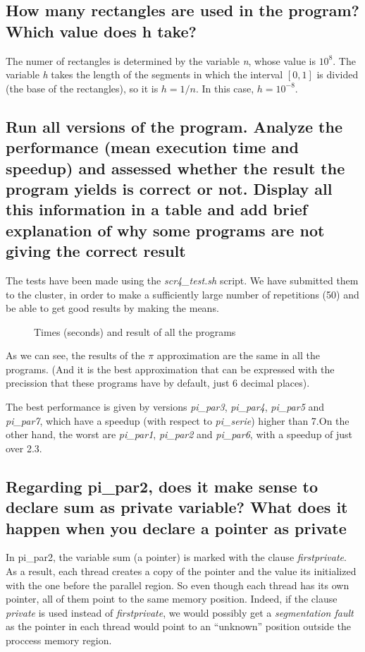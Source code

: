 \documentclass{article}
\newcommand{\question}[1]{\subsection{#1}}
\begin{document}
\question{How many rectangles are used in the program? Which value does h take?}

The numer of rectangles is determined by the variable \emph{n}, whose value is ${10^8}$. The variable \emph{h} takes the length of the segments in which the interval $[0,1]$ is divided (the base of the rectangles), so it is $h=1/n$. In this case, $h=10^{-8}$.

\question{ Run all versions of the program. Analyze the performance (mean execution time and speedup) and assessed whether the result the program yields is correct or not. Display all this information in a table and add brief explanation of why some programs are not giving the correct result}

The tests have been made using the \emph{scr4\_test.sh} script. We have submitted them to the cluster, in order to make a sufficiently large number of repetitions (50) and be able to get good results by making the means.

\begin{figure}[h]
    
    \centering
    \caption{Times (seconds) and result of all the programs}
\end{figure}

As we can see, the results of the $\pi$ approximation are the same in all the programs. (And it is the best approximation that can be expressed with the precission that these programs have by default, just 6 decimal places).

The best performance is given by versions \emph{pi\_par3}, \emph{pi\_par4}, \emph{pi\_par5}  and \emph{pi\_par7}, which have a speedup (with respect to \emph{pi\_serie}) higher than 7.On the other hand, the worst are \emph{pi\_par1}, \emph{pi\_par2} and \emph{pi\_par6}, with a speedup of just over 2.3.

\question{Regarding pi\_par2, does it make sense to declare sum as private variable? What does it happen when you declare a pointer as private}

In pi\_par2, the variable sum (a pointer) is marked with the clause \emph{firstprivate}. As a result, each thread creates a copy of the pointer and the value its initialized with the one before the parallel region. So even though each thread has its own pointer, all of them point to the same memory position. Indeed, if the clause \emph{private} is used instead of \emph{firstprivate}, we would possibly get a \emph{segmentation fault} as the pointer in each thread would point to an ``unknown'' position outside the proccess memory region.
\end{document}
